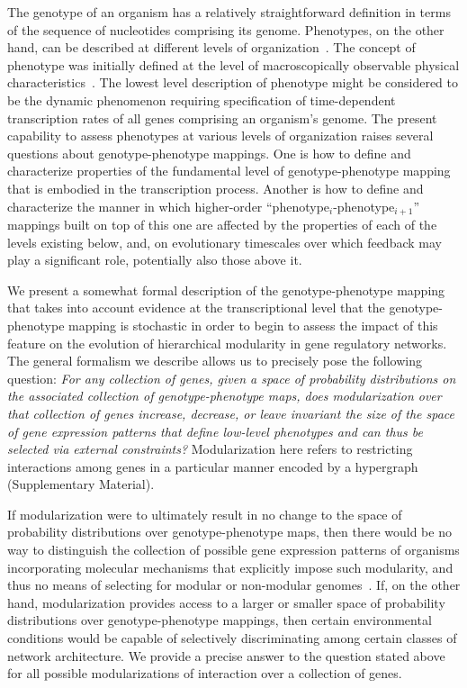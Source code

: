 The genotype of an organism has a relatively straightforward definition in terms of the sequence of nucleotides comprising its genome. Phenotypes, on the other hand, can be described at different levels of organization~\cite{Dawkins1982,Stadler2001}. The concept of phenotype was initially defined at the level of macroscopically observable physical characteristics~\cite{Johannsen1911}. The lowest level description of phenotype might be considered to be the dynamic phenomenon requiring specification of time-dependent transcription rates of all genes comprising an organism's genome. The present capability to assess phenotypes at various levels of organization raises several questions about genotype-phenotype mappings. One is how to define and characterize properties of the fundamental level of genotype-phenotype mapping that is embodied in the transcription process. Another is how to define and characterize the manner in which higher-order ``phenotype$_i$-phenotype$_{i+1}$'' mappings built on top of this one are affected by the properties of each of the levels existing below, and, on evolutionary timescales over which feedback may play a significant role, potentially also those above it.

We present a somewhat formal description of the genotype-phenotype mapping that takes into account evidence at the transcriptional level that the genotype-phenotype mapping is stochastic \cite{Swain2002,Paulsson2004,Thattai2004,Acar2008a,Lestas2010,So2011,Munsky2012,Neuert2013,Sanchez2013} in order to begin to assess the impact of this feature on the evolution of hierarchical modularity in gene regulatory networks. The general formalism we describe allows us to precisely pose the following question: \emph{For any collection of genes, given a space of probability distributions on the associated collection of genotype-phenotype maps, does modularization over that collection of genes increase, decrease, or leave invariant the size of the space of gene expression patterns that define low-level phenotypes and can thus be selected via external constraints?} Modularization here refers to restricting interactions among genes in a particular manner encoded by a hypergraph (Supplementary Material).

If modularization were to ultimately result in no change to the space of probability distributions over genotype-phenotype maps, then there would be no way to distinguish the collection of possible gene expression patterns of organisms incorporating molecular mechanisms that explicitly impose such modularity, and thus no means of selecting for modular or non-modular genomes~\cite{Jothi2009,Colm}. If, on the other hand, modularization provides access to a larger or smaller space of probability distributions over genotype-phenotype mappings, then certain environmental conditions would be capable of selectively discriminating among certain classes of network architecture. We provide a precise answer to the question stated above for all possible modularizations of interaction over a collection of genes.

